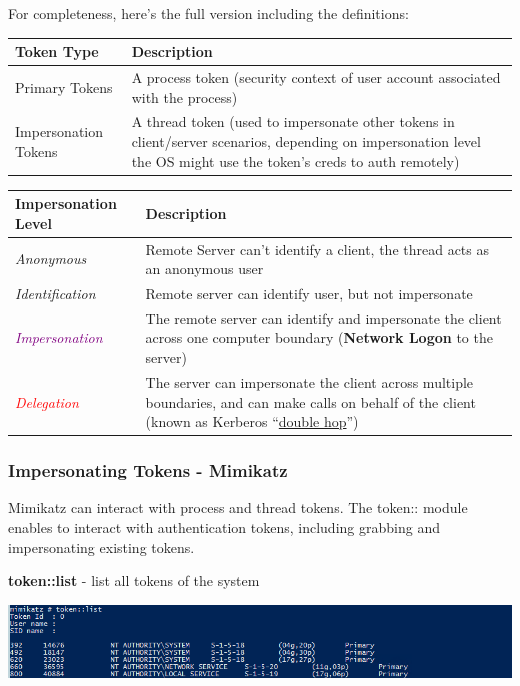 For completeness, here's the full version including the definitions:

\begin{tabular}{|l|p{10cm}|}
    \hline
    \textbf{Token Type} & \textbf{Description} \\
    \hline
    Primary Tokens & A process token (security context of user account associated with the process) \\
    \hline
    Impersonation Tokens & A thread token (used to impersonate other tokens in client/server scenarios, depending on impersonation level the OS might use the token's creds to auth remotely) \\
    \hline
\end{tabular}

\vspace{0.5cm}

\begin{tabular}{|l|p{10cm}|}
    \hline
    \textbf{Impersonation Level} & \textbf{Description} \\
    \hline
    \textit{Anonymous} & Remote Server can't identify a client, the thread acts as an anonymous user \\
    \hline
    \textit{Identification} & Remote server can identify user, but not impersonate \\
    \hline
    \textit{\textcolor{purple}{Impersonation}} & The remote server can identify and impersonate the client across one computer boundary (\textbf{Network Logon} to the server) \\
    \hline
    \textit{\textcolor{red}{Delegation}} & The server can impersonate the client across multiple boundaries, and can make calls on behalf of the client (known as Kerberos ``\underline{double hop}'') \\
    \hline
\end{tabular}

\subsubsection{Impersonating Tokens - Mimikatz}
Mimikatz can interact with process and thread tokens. The token:: module enables to interact with authentication tokens, including grabbing and impersonating existing tokens.

\textbf{token::list} - list all tokens of the system 
\begin{center}
    \includegraphics[width=\textwidth]{resources/11-impersonating-tokens.png}
\end{center}

